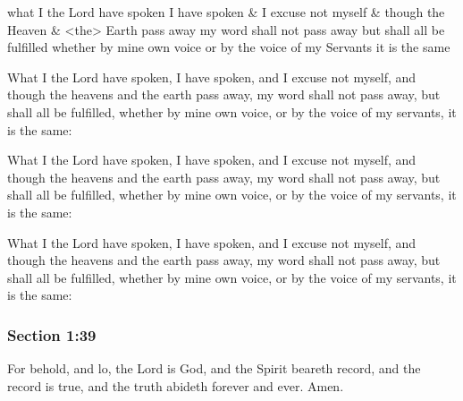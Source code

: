 		\begin{framed}
		\scriptsize
			\begin{compactdesc}
				\item[JSP] what I the Lord have spoken I have spoken \& I excuse not myself \& though the Heaven \& <the> Earth pass away my word shall not pass away but shall all be fulfilled whether by mine own voice or by the voice of my Servants it is the same
				\item[BC] What I the Lord have spoken, I have spoken, and I excuse not myself, and though the heavens and the earth pass away, my word shall not pass away, but shall all be fulfilled, whether by mine own voice, or by the voice of my servants, it is the same:
				\item[DC 1835] What I the Lord have spoken, I have spoken, and I excuse not myself, and though the heavens and the earth pass away, my word shall not pass away, but shall all be fulfilled, whether by mine own voice, or by the voice of my servants, it is the same:
				\item[DC 1844] What I the Lord have spoken, I have spoken, and I excuse not myself, and though the heavens and the earth pass away, my word shall not pass away, but shall all be fulfilled, whether by mine own voice, or by the voice of my servants, it is the same:
			\end{compactdesc}
		\end{framed}

	\subsubsection{Section 1:39} %
		\label{DC1-39}

		For behold, and lo, the Lord is God, and the Spirit beareth record, and the record is true, and the truth abideth forever and ever. Amen.

